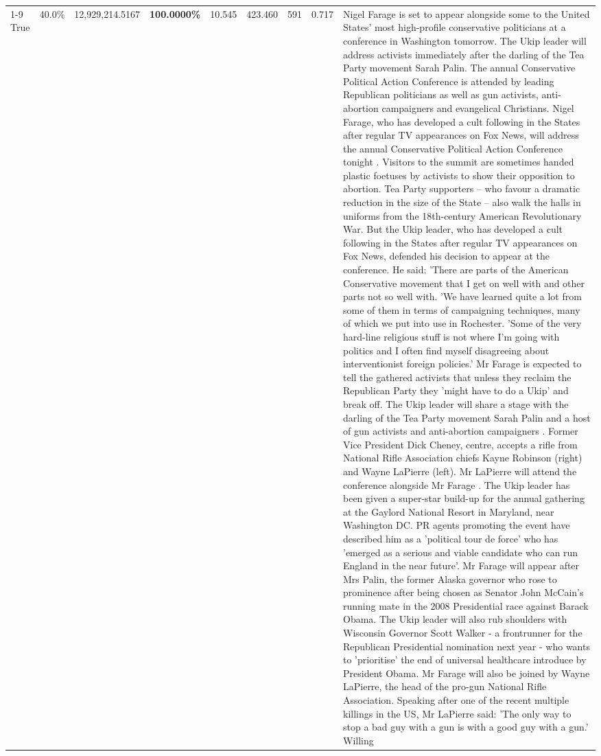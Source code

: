 \begin{table}[H]
\begin{tabular}{lllrlllll}
\cline{1-9}
True & 40.0\% & 12,929,214.5167 & \bfseries \color{red} 100.0000\% & 10.545 & 423.460 & 591 & 0.717 & Nigel Farage is set to appear alongside some to the United States' most high-profile conservative politicians at a conference in Washington tomorrow. The Ukip leader will address activists immediately after the darling of the Tea Party movement Sarah Palin. The annual Conservative Political Action Conference is attended by leading Republican politicians as well as gun activists, anti-abortion campaigners and evangelical Christians. Nigel Farage, who has developed a cult following in the States after regular TV appearances on Fox News, will address the annual Conservative Political Action Conference tonight . Visitors to the summit are sometimes handed plastic foetuses by activists to show their opposition to abortion. Tea Party supporters – who favour a dramatic reduction in the size of the State – also walk the halls in uniforms from the 18th-century American Revolutionary War. But the Ukip leader, who has developed a cult following in the States after regular TV appearances on Fox News, defended his decision to appear at the conference. He said: 'There are parts of the American Conservative movement that I get on well with and other parts not so well with. 'We have learned quite a lot from some of them in terms of campaigning techniques, many of which we put into use in Rochester. 'Some of the very hard-line religious stuff is not where I'm going with politics and I often find myself disagreeing about interventionist foreign policies.' Mr Farage is expected to tell the gathered activists that unless they reclaim the Republican Party they 'might have to do a Ukip' and break off. The Ukip leader will share a stage with the darling of the Tea Party movement Sarah Palin and a host of gun activists and anti-abortion campaigners . Former Vice President Dick Cheney, centre, accepts a rifle from National Rifle Association chiefs Kayne Robinson (right) and Wayne LaPierre (left). Mr LaPierre will attend the conference alongside Mr Farage . The Ukip leader has been given a super-star build-up for the annual gathering at the Gaylord National Resort in Maryland, near Washington DC. PR agents promoting the event have described him as a 'political tour de force' who has 'emerged as a serious and viable candidate who can run England in the near future'. Mr Farage will appear after Mrs Palin, the former Alaska governor who rose to prominence after being chosen as Senator John McCain's running mate in the 2008 Presidential race against Barack Obama. The Ukip leader will also rub shoulders with Wisconsin Governor Scott Walker - a frontrunner for the Republican Presidential nomination next year - who wants to 'prioritise' the end of universal healthcare introduce by President Obama. Mr Farage will also be joined by Wayne LaPierre, the head of the pro-gun National Rifle Association. Speaking after one of the recent multiple killings in the US, Mr LaPierre said: 'The only way to stop a bad guy with a gun is with a good guy with a gun.' Willing \\

\end{tabular}
\end{table}
